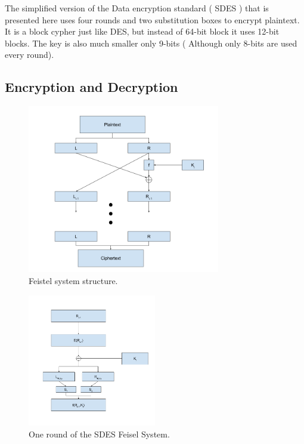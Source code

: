 The simplified version of the Data encryption standard ( SDES ) that is presented here uses four rounds and two substitution boxes to encrypt plaintext.
It is a block cypher just like DES, but instead of 64-bit block it uses 12-bit blocks. 
The key is also much smaller only 9-bits ( Although only 8-bits are used every round).

\subsection{Encryption and Decryption}

\begin{figure}[ht]
\begin{center}
\includegraphics[width=0.75\textwidth]{./SDESflow}
\end{center}
\caption{Feistel system structure.}
\end{figure}

\begin{figure}[ht]
\begin{center}
\includegraphics[width=0.5\textwidth]{./fFunc}
\end{center}
\caption{ One round of the SDES Feisel System.}
\end{figure}



